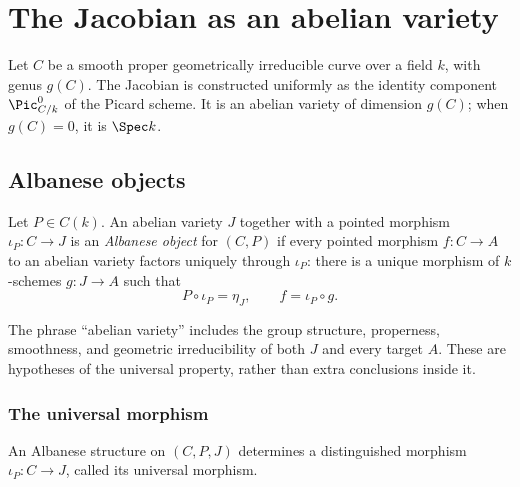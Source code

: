 \chapter{The Jacobian as an abelian variety}
\label{chap:Jacobian}

Let \(C\) be a smooth proper geometrically irreducible curve over a field
\(k\), with genus \(g(C)\).  The Jacobian is constructed uniformly as the
identity component \(\Pic^0_{C/k}\) of the Picard scheme.  It is an abelian
variety of dimension \(g(C)\); when \(g(C)=0\), it is \(\Spec k\).

\section{Albanese objects}

\begin{definition}\leanok
  \label{def:IsAlbanese}
  Let \(P \in C(k)\).  An abelian variety \(J\) together with a pointed
  morphism \(\iota_P \colon C \to J\) is an \emph{Albanese object} for
  \((C,P)\) if every pointed morphism \(f \colon C \to A\) to an abelian
  variety factors uniquely through \(\iota_P\): there is a unique morphism of
  \(k\)-schemes \(g \colon J \to A\) such that
  \[
    P \circ \iota_P = \eta_J,
    \qquad
    f = \iota_P \circ g.
  \]
\end{definition}

\begin{remark}
  \label{rem:IsAlbanese_typeclasses}
  The phrase ``abelian variety'' includes the group structure, properness,
  smoothness, and geometric irreducibility of both \(J\) and every target
  \(A\).  These are hypotheses of the universal property, rather than extra
  conclusions inside it.
\end{remark}

\subsection{The universal morphism}

\begin{definition}\leanok
  \label{def:IsAlbanese_ofCurve}
  An Albanese structure on \((C,P,J)\) determines a distinguished morphism
  \(\iota_P \colon C \to J\), called its universal morphism.
\end{definition}

